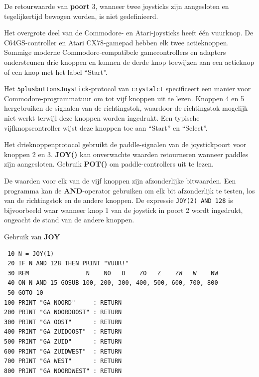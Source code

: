 \begin{description}[leftmargin=2cm,style=nextline]
\item [Opmerkingen:]  De retourwaarde van {\bf poort} 3, wanneer twee joysticks zijn aangesloten en tegelijkertijd bewogen worden, is niet gedefinieerd.

                  Het overgrote deel van de Commodore- en Atari-joysticks heeft één vuurknop. De C64GS-controller en Atari CX78-gamepad hebben elk twee actieknoppen. Sommige moderne Commodore-compatibele gamecontrollers en adapters ondersteunen drie knoppen en kunnen de derde knop toewijzen aan een actieknop of een knop met het label ``Start''.

Het \texttt{5plusbuttonsJoystick}-protocol van \texttt{crystalct} specificeert een manier voor Commodore-programmatuur om tot vijf knoppen uit te lezen. Knoppen 4 en 5 hergebruiken de signalen van de richtingstok, waardoor de richtingstok mogelijk niet werkt terwijl deze knoppen worden ingedrukt. Een typische vijfknopscontroller wijst deze knoppen toe aan ``Start'' en ``Select''.

                  Het drieknoppenprotocol gebruikt de paddle-signalen van de joystickpoort voor knoppen 2 en 3. {\bf JOY()} kan onverwachte waarden retourneren wanneer paddles zijn aangesloten. Gebruik {\bf POT()} om paddle-controllers uit te lezen.

                  De waarden voor elk van de vijf knoppen zijn afzonderlijke bitwaarden. Een programma kan de {\bf AND}-operator gebruiken om elk bit afzonderlijk te testen, los van de richtingstok en de andere knoppen. De expressie \texttt{JOY(2) AND 128} is bijvoorbeeld waar wanneer knop 1 van de joystick in poort 2 wordt ingedrukt, ongeacht de stand van de andere knoppen.

\item [Voorbeeld:]  Gebruik van {\bf JOY}

\begin{tcolorbox}[colback=black,coltext=white]
\verbatimfont{\codefont}
\begin{verbatim}
 10 N = JOY(1)
 20 IF N AND 128 THEN PRINT "VUUR!"
 30 REM                N    NO   O    ZO   Z    ZW   W    NW
 40 ON N AND 15 GOSUB 100, 200, 300, 400, 500, 600, 700, 800
 50 GOTO 10
100 PRINT "GA NOORD"     : RETURN
200 PRINT "GA NOORDOOST" : RETURN
300 PRINT "GA OOST"      : RETURN
400 PRINT "GA ZUIDOOST"  : RETURN
500 PRINT "GA ZUID"      : RETURN
600 PRINT "GA ZUIDWEST"  : RETURN
700 PRINT "GA WEST"      : RETURN
800 PRINT "GA NOORDWEST" : RETURN
\end{verbatim}
\end{tcolorbox}
\end{description}


